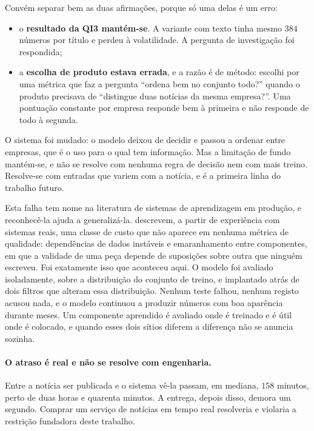 Convém separar bem as duas afirmações, porque só uma delas é um erro:

\begin{itemize}
  \item o \textbf{resultado da \gls{QI}3 mantém-se}. A variante com texto tinha mesmo $384$ números
        por título e perdeu à volatilidade. A pergunta de investigação foi respondida;
  \item a \textbf{escolha de produto estava errada}, e a razão é de método: escolhi por uma métrica
        que faz a pergunta ``ordena bem no conjunto todo?'' quando o produto precisava de
        ``distingue duas notícias da mesma empresa?''. Uma pontuação constante por empresa responde
        bem à primeira e não responde de todo à segunda.
\end{itemize}

O sistema foi mudado: o modelo deixou de decidir e passou a ordenar entre empresas, que é o uso
para o qual tem informação. Mas a limitação de fundo mantém-se, e não se resolve com nenhuma regra
de decisão nem com mais treino. Resolve-se com entradas que variem com a notícia, e é a primeira
linha do trabalho futuro.

Esta falha tem nome na literatura de sistemas de aprendizagem em produção, e reconhecê-la ajuda a
generalizá-la. \textcite{sculley2015debt} descrevem, a partir de experiência com sistemas reais,
uma classe de custo que não aparece em nenhuma métrica de qualidade: dependências de dados
instáveis e emaranhamento entre componentes, em que a validade de uma peça depende de suposições
sobre outra que ninguém escreveu. Foi exatamente isso que aconteceu aqui. O modelo foi avaliado
isoladamente, sobre a distribuição do conjunto de treino, e implantado atrás de dois filtros que
alteram essa distribuição. Nenhum teste falhou, nenhum registo acusou nada, e o modelo continuou a
produzir números com boa aparência durante meses. Um componente aprendido é avaliado onde é
treinado e é útil onde é colocado, e quando esses dois sítios diferem a diferença não se anuncia
sozinha.

\paragraph{O atraso é real e não se resolve com engenharia.}
Entre a notícia ser publicada e o sistema vê-la passam, em mediana, $158$ minutos, perto de duas
horas e quarenta minutos. A
entrega, depois disso, demora um segundo. Comprar um serviço de notícias em tempo real resolveria e
violaria a restrição fundadora deste trabalho.

